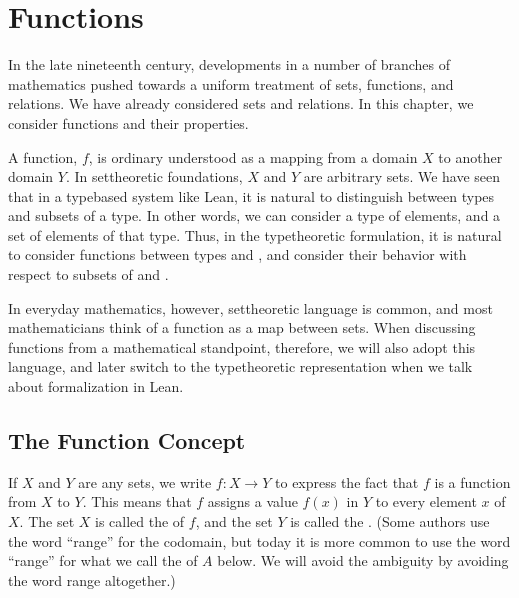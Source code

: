 \documentclass[letterpaper,10pt,english]{sphinxmanual}
\begin{document}
\chapter{Functions}
\label{\detokenize{functions:functions}}\label{\detokenize{functions:id1}}\label{\detokenize{functions::doc}}
\sphinxAtStartPar
In the late nineteenth century, developments in a number of branches of mathematics pushed towards a uniform treatment of sets, functions, and relations. We have already considered sets and relations. In this chapter, we consider functions and their properties.

\sphinxAtStartPar
A function, \(f\), is ordinary understood as a mapping from a domain \(X\) to another domain \(Y\). In set\sphinxhyphen{}theoretic foundations, \(X\) and \(Y\) are arbitrary sets. We have seen that in a type\sphinxhyphen{}based system like Lean, it is natural to distinguish between types and subsets of a type. In other words, we can consider a type  of elements, and a set  of elements of that type. Thus, in the type\sphinxhyphen{}theoretic formulation, it is natural to consider functions between types  and , and consider their behavior with respect to subsets of  and .

\sphinxAtStartPar
In everyday mathematics, however, set\sphinxhyphen{}theoretic language is common, and most mathematicians think of a function as a map between sets. When discussing functions from a mathematical standpoint, therefore, we will also adopt this language, and later switch to the type\sphinxhyphen{}theoretic representation when we talk about formalization in Lean.


\section{The Function Concept}
\label{\detokenize{functions:the-function-concept}}
\sphinxAtStartPar
If \(X\) and \(Y\) are any sets, we write \(f : X \to Y\) to express the fact that \(f\) is a function from \(X\) to \(Y\). This means that \(f\) assigns a value \(f(x)\) in \(Y\) to every element \(x\) of \(X\). The set \(X\) is called the  of \(f\), and the set \(Y\) is called the . (Some authors use the word “range” for the codomain, but today it is more common to use the word “range” for what we call the  of \(A\) below. We will avoid the ambiguity by avoiding the word range altogether.)
\end{document}
